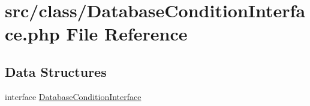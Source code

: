 \hypertarget{_database_condition_interface_8php}{}\section{src/class/\+Database\+Condition\+Interface.php File Reference}
\label{_database_condition_interface_8php}
\subsection*{Data Structures}
\begin{DoxyCompactItemize}
\item 
interface \hyperlink{interface_database_condition_interface}{Database\+Condition\+Interface}
\end{DoxyCompactItemize}
